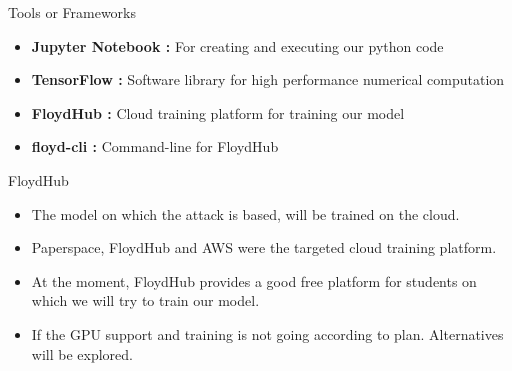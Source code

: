 \documentclass[10pt]{beamer}
\begin{document}
\begin{frame}{Tools or Frameworks}
	\begin{itemize}
	    \item \textbf{Jupyter Notebook :} For creating and executing our python code
	    \item \textbf{TensorFlow :} Software library for high performance numerical computation
	    \item \textbf{FloydHub :} Cloud training platform for training our model
	    
	    \item \textbf{floyd-cli :} Command-line for FloydHub
	    
	   
	   
	    
	\end{itemize}
\end{frame}

\begin{frame}{FloydHub}
    
    \begin{itemize}
	    
	    \item The model on which the attack is based, will be trained on the cloud.
	    
	    \item Paperspace, FloydHub and AWS were the targeted cloud training platform.
	    
	    \item At the moment, FloydHub provides a good free platform for students on which we will try to train our model.
	    \item If the GPU support and training is not going according to plan. Alternatives will be explored.
	    
	    
	\end{itemize}
    
\end{frame}
\end{document}
